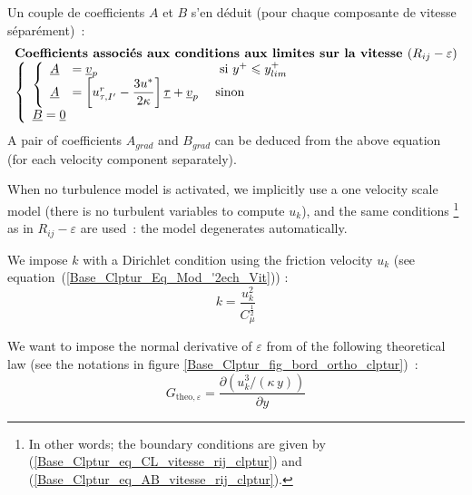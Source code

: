 Un couple de coefficients $A$ et $B$ s'en d\'eduit (pour
chaque composante de vitesse s\'epar\'ement)~:
\begin{equation}\label{Base_Clptur_eq_AB_vitesse_rij_clptur}
\begin{array}{l}
\text{\bf Coefficients associ\'es aux conditions aux limites sur la vitesse }(R_{ij}-\varepsilon)\\
\left\{\begin{array}{l}
\left\{\begin{array}{lll}
\underline{A}&=\underline{v}_p& \text{ \ si\ } y^+\leqslant y^+_{lim} \\
\underline{A}&=\left[u^r_{\tau,I'}-\displaystyle\frac{3u^*}{2\kappa } \right]\underline{\tau}
+\underline{v}_p &\text{ sinon }
\end{array}\right.\\
\underline{B}= \underline{0}
\end{array}\right.
\end{array}
\end{equation}
A pair of coefficients $A_{grad}$ and $B_{grad}$ can be deduced
from the above equation
(for each velocity component separately).


When no turbulence model is activated, we implicitly use a one velocity
scale model (there is no turbulent variables to compute  $u_k$), and the same
conditions
\footnote{In other words; the boundary conditions are given by
 (\ref{Base_Clptur_eq_CL_vitesse_rij_clptur}) and
(\ref{Base_Clptur_eq_AB_vitesse_rij_clptur}).}
 as in $R_{ij}-\varepsilon$ are used~: the model degenerates automatically.



\newpage


We impose $k$ with a Dirichlet condition using the friction velocity
$u_k$ (see equation~(\ref{Base_Clptur_Eq_Mod_'2ech_Vit})) :
\begin{equation}
k= \displaystyle\frac{u_k^2}{C_\mu^\frac{1}{2}}
\end{equation}

We want to impose the normal derivative of  $\varepsilon$ from
of the following theoretical law
 (see the notations in figure \ref{Base_Clptur_fig_bord_ortho_clptur})~:
\begin{equation}\label{Base_Clptur_eq_partialep_theo_clptur}
G_{\text{theo},\varepsilon} = \displaystyle\frac{\partial \left(u_k^3/(\kappa\, y)\right)}{\partial y}
\end{equation}



